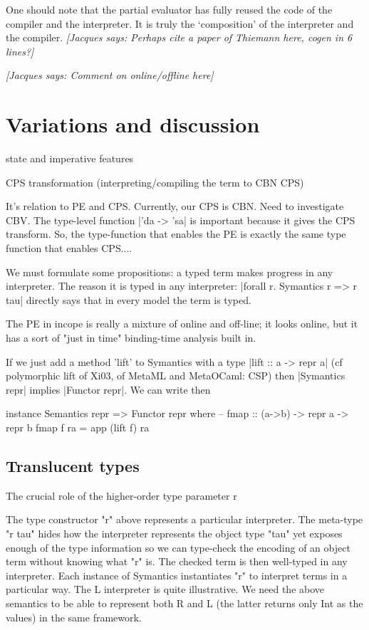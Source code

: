 \documentclass[preprint]{sigplanconf}
\newcommand{\jacques}[1]{{\it [Jacques says: #1]}}
\begin{document}
One should note that the partial evaluator has fully reused the code
of the compiler and the interpreter. It is truly the `composition' of the
interpreter and the compiler.  \jacques{Perhaps cite a paper of Thiemann
here, cogen in 6 lines?}

\jacques{Comment on online/offline here}


\section{Variations and discussion}\label{discussion}

state and imperative features

CPS transformation (interpreting/compiling the term to CBN CPS)

It's relation to PE and CPS. Currently, our CPS is CBN. Need to
investigate CBV.
The type-level function |'da -> 'sa| is important because it gives 
the CPS transform. So, the type-function
that enables the PE is exactly the same type function that enables
CPS....


We must formulate some propositions: a typed term makes progress in
any interpreter. The reason it is typed in any interpreter:
|forall r. Symantics r => r tau| directly says that in every model the
term is typed. 

The PE in incope is really a mixture of online and off-line; it looks 
online, but it has a sort of "just in time" binding-time analysis built in.

If we just add a method 'lift' to Symantics with a type
|lift :: a -> repr a| (cf polymorphic lift of Xi03, of MetaML and
MetaOCaml: CSP)
then |Symantics repr| implies |Functor repr|. We can write then
\begin{code}
  instance Semantics repr => Functor repr where
  -- fmap :: (a->b) -> repr a -> repr b
  fmap f ra = app (lift f) ra
\end{code}

\subsection{Translucent types}
The crucial role of the higher-order type parameter r

The type constructor "r" above represents a particular interpreter.  The
meta-type "r tau" hides how the interpreter represents the object type
"tau" yet exposes enough of the type information so we can type-check
the encoding of an object term without knowing what "r" is.  The checked
term is then well-typed in any interpreter.  Each instance of Symantics
instantiates "r" to interpret terms in a particular way. The L
interpreter is quite illustrative. We need the above semantics to be
able to represent both R and L (the latter returns only Int as the
values) in the same framework.
\end{document}
